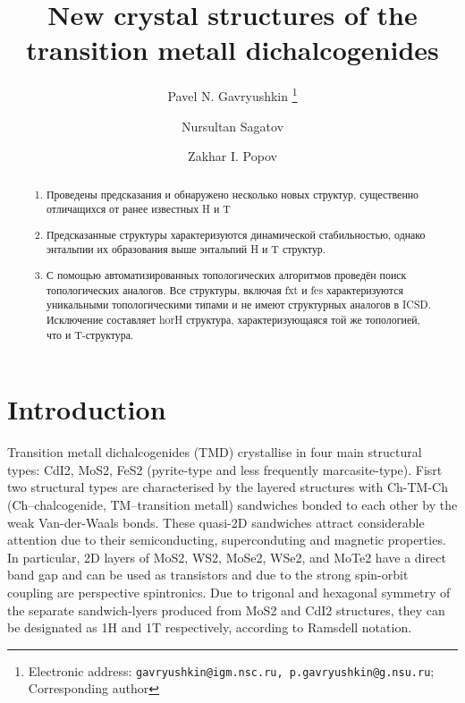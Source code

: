 \documentclass[a4paperm]{article}
\begin{document}

\title{New crystal structures of the transition metall dichalcogenides}


\author[1,2]{Pavel N. Gavryushkin
   \thanks{Electronic address: \texttt{gavryushkin@igm.nsc.ru, p.gavryushkin@g.nsu.ru}; Corresponding author}}     
\author[1]{Nursultan Sagatov}
\author[3]{Zakhar I. Popov}


\date{}
\maketitle


\begin{abstract}
\begin{enumerate}
	\item Проведены предсказания и обнаружено несколько новых  структур, существенно отличащихся от ранее известных H и T 
	\item Предсказанные структуры характеризуются динамической стабильностью, однако энтальпии их образования выше энтальпий H и T структур.
	 \item С помощью автоматизированных топологических алгоритмов проведён поиск топологических аналогов. Все структуры, включая fxt и fes характеризуются уникальными топологическими типами и не имеют структурных аналогов в ICSD. Исключение составляет horH структура, характеризующаяся той же топологией, что и T-структура. 
\end{enumerate}
\end{abstract}

\section*{Introduction}
Transition metall dichalcogenides (TMD) crystallise in four main structural types: CdI2, MoS2, FeS2 (pyrite-type and less frequently marcasite-type).
Fisrt two structural types are characterised by the layered structures with Ch-TM-Ch (Ch--chalcogenide, TM--transition metall) sandwiches bonded to each other by the weak Van-der-Waals bonds. 
These quasi-2D sandwiches attract considerable attention due to their semiconducting, superconduting and magnetic properties.
In particular, 2D layers of MoS2, WS2, MoSe2, WSe2, and MoTe2 have a direct band gap and can be used as transistors and due to the strong spin-orbit coupling are perspective spintronics.
Due to trigonal and hexagonal symmetry of the separate sandwich-lyers produced from MoS2 and CdI2 structures, they can be designated as 1H and 1T respectively, according to Ramsdell notation.  
\end{document}
